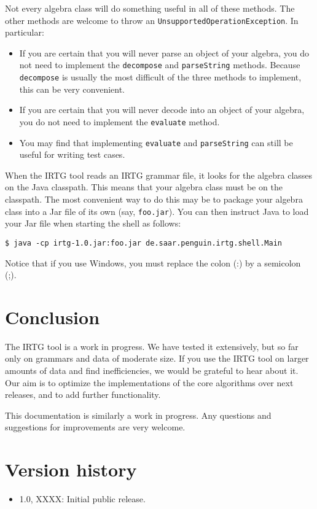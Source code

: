 \documentclass[11pt]{article}
\begin{document}
Not every algebra class will do something useful in all of these
methods. The other methods are welcome to throw an
\verb?UnsupportedOperationException?. In particular:

\begin{itemize}
\item If you are certain that you will never parse an object of your
  algebra, you do not need to implement the \verb?decompose? and
  \verb?parseString?  methods. Because \verb?decompose? is usually the
  most difficult of the three methods to implement, this can be very
  convenient.
\item If you are certain that you will never decode into an object of
  your algebra, you do not need to implement the \verb?evaluate?
  method.
\item You may find that implementing \verb?evaluate? and
  \verb?parseString? can still be useful for writing test cases.
\end{itemize}

When the IRTG tool reads an IRTG grammar file, it looks for the
algebra classes on the Java classpath. This means that your algebra
class must be on the classpath. The most convenient way to do this may
be to package your algebra class into a Jar file of its own (say,
\verb?foo.jar?). You can then instruct Java to load your Jar file when
starting the shell as follows:

\begin{verbatim}
$ java -cp irtg-1.0.jar:foo.jar de.saar.penguin.irtg.shell.Main
\end{verbatim}

Notice that if you use Windows, you must replace the colon (:) by a
semicolon (;).


\section{Conclusion} \label{sec:conclusion}

The IRTG tool is a work in progress. We have tested it extensively,
but so far only on grammars and data of moderate size. If you use the
IRTG tool on larger amounts of data and find inefficiencies, we would
be grateful to hear about it. Our aim is to optimize the
implementations of the core algorithms over next releases, and to add
further functionality.

This documentation is similarly a work in progress. Any questions and
suggestions for improvements are very welcome.


\section{Version history}

\begin{itemize}
\item 1.0, XXXX: Initial public release.
\end{itemize}




\end{document}

